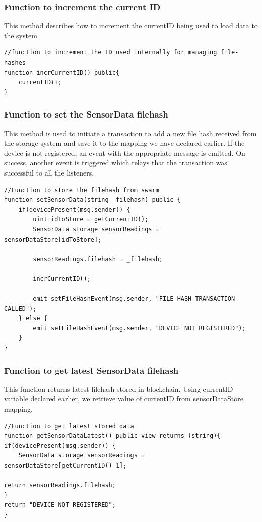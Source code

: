 \documentclass[11pt,openright]{report}
\begin{document}
\subsubsection{Function to increment the current ID}
This method describes how to increment the currentID being used to load data to the system.
\begin{verbatim}
//function to increment the ID used internally for managing file-hashes
function incrCurrentID() public{
    currentID++;
}
\end{verbatim}

\subsubsection{Function to set the SensorData filehash}
This method is used to initiate a transaction to add a new file hash received from the storage system and save it to the mapping we have declared earlier. If the device is not registered, an event with the appropriate message is emitted. On success, another event is triggered which relays that the transaction was successful to all the listeners.

\begin{verbatim}
//Function to store the filehash from swarm
function setSensorData(string _filehash) public {
    if(devicePresent(msg.sender)) {
        uint idToStore = getCurrentID();
        SensorData storage sensorReadings = sensorDataStore[idToStore];

        sensorReadings.filehash = _filehash;
   
        incrCurrentID();
        
        emit setFileHashEvent(msg.sender, "FILE HASH TRANSACTION CALLED");
    } else {
        emit setFileHashEvent(msg.sender, "DEVICE NOT REGISTERED");
    }
}
\end{verbatim}

\subsubsection{Function to get latest SensorData filehash}
This function returns latest filehash stored in blockchain. Using currentID variable declared earlier, we retrieve value of currentID from sensorDataStore mapping.

\begin{verbatim}
//Function to get latest stored data
function getSensorDataLatest() public view returns (string){
if(devicePresent(msg.sender)) {
    SensorData storage sensorReadings = sensorDataStore[getCurrentID()-1];

return sensorReadings.filehash;
}
return "DEVICE NOT REGISTERED";
}
\end{verbatim}
\end{document}
